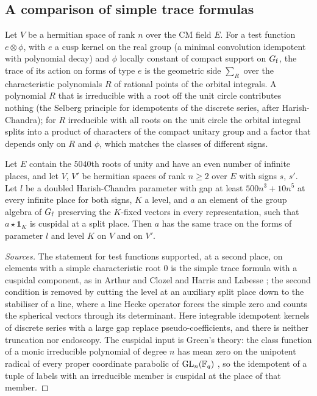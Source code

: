 \subsection{A comparison of simple trace formulas}\label{ss:B-trace-comparison}
Let $V$ be a hermitian space of rank $n$ over the CM field $E$. For a test function $e\otimes\phi$, with $e$ a cusp kernel on the real group (a minimal convolution
idempotent with polynomial decay) and $\phi$ locally constant of compact support on $G_{\rm f}$, the trace of its action on forms of type $e$ is the geometric side
$\sum_R$ over the characteristic polynomials $R$ of rational points of the orbital integrals. A polynomial $R$ that is irreducible with a root off the unit circle contributes
nothing (the Selberg principle for idempotents of the discrete series, after Harish-Chandra); for $R$ irreducible with all roots on the unit circle the orbital integral
splits into a product of characters of the compact unitary group and a factor that depends only on $R$ and $\phi$, which matches the classes of different signs.

\begin{theorem}\label{thm:B-trace-comparison}
Let $E$ contain the $5040$th roots of unity and have an even number of infinite places, and let $V$, $V'$ be hermitian spaces of rank $n\ge2$ over $E$ with signs $s$, $s'$.
Let $l$ be a doubled Harish-Chandra parameter with gap at least $500n^3+10n^5$ at every infinite place for both signs, $K$ a level, and $a$ an element of the group algebra of
$G_{\rm f}$ preserving the $K$-fixed vectors in every representation, such that $a\star\mathbf 1_K$ is cuspidal at a split place. Then $a$ has the same trace on the forms of
parameter $l$ and level $K$ on $V$ and on $V'$.
\end{theorem}

\begin{proof}[Sources]
The statement for test functions supported, at a second place, on elements with a simple characteristic root $0$ is the simple trace formula with a cuspidal
component, as in Arthur and Clozel \cite[Ch.~1]{ArthurClozel1989} and Harris and Labesse \cite[Prop.~1.10.5]{HarrisLabesse2004}; the second condition is removed by
cutting the level at an auxiliary split place down to the stabiliser of a line, where a line Hecke operator forces the simple zero and counts the spherical vectors through
its determinant. Here integrable idempotent kernels of discrete series with a large gap replace pseudo-coefficients, and there is neither truncation nor endoscopy. The cuspidal
input is Green's theory: the class function of a monic irreducible polynomial of degree $n$ has mean zero on the unipotent radical of every proper coordinate parabolic of
$\operatorname{GL}_n(\mathbb{F}_q)$ \cite{Green1955}, so the idempotent of a tuple of labels with an irreducible member is cuspidal at the place of that member.
\end{proof}

